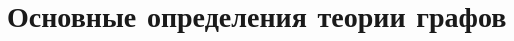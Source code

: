 \documentclass[discrete.tex]{subfiles}
\begin{document}
\section{Основные определения теории графов}
\end{document}
